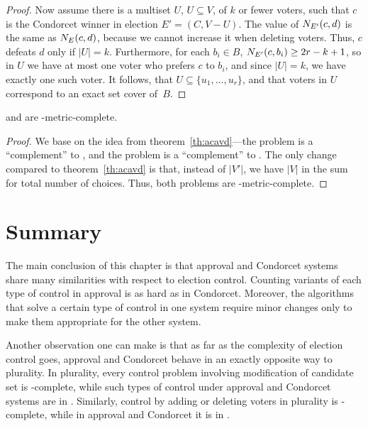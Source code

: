\begin{proof}
Now assume there is a multiset $U$, $U\subseteq V$, of $k$ or fewer voters, such that $c$ is the Condorcet winner in election $E'=(C,V-U)$.
The value of $N_{E'}(c,d)$ is the same as $N_{E}(c,d)$, because we cannot increase it when deleting voters.
Thus, $c$ defeats $d$ only if $|U|=k$.
Furthermore, for each $b_i\in B$, $N_{E'}(c,b_i)\ge2r-k+1$, so in $U$ we have at most one voter who prefers $c$ to $b_i$, and since $|U|=k$, we have exactly one such voter.
It follows, that $U\subseteq\{u_1,\dots,u_r\}$, and that voters in $U$ correspond to an exact set cover of~$B$.
\end{proof}

\begin{theorem} \label{th:acdvd}
	 and  are \sharpPclass-metric-complete.
\end{theorem}

\begin{proof}
We base on the idea from theorem~\ref{th:acavd}---the problem  is a ``complement'' to , and the problem  is a ``complement'' to .
The only change compared to theorem~\ref{th:acavd} is that, instead of $|V'|$, we have $|V|$ in the sum for total number of choices.
Thus, both problems are \sharpPclass-metric-complete.
\end{proof}

\section{Summary} \label{sec:acsum}

The main conclusion of this chapter is that approval and Condorcet systems share many similarities with respect to election control.
Counting variants of each type of control in approval is as hard as in Condorcet.
Moreover, the algorithms that solve a certain type of control in one system require minor changes only to make them appropriate for the other system.

Another observation one can make is that as far as the complexity of election control goes, approval and Condorcet behave in an exactly opposite way to plurality.
In plurality, every control problem involving modification of candidate set is \sharpPclass-complete, while such types of control under approval and Condorcet systems are in \FPclass.
Similarly, control by adding or deleting voters in plurality is \sharpPclass-complete, while in approval and Condorcet it is in \FPclass.
